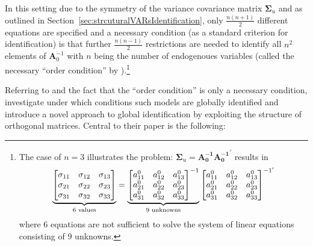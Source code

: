 \documentclass[a4paper,11pt,listof=nochaptergap,oneside,pointednumbers,bibtotoc,bigheadings,liststotoc,hidelinks]{scrbook}
\theoremstyle{mysatz}
\theoremstyle{mydefinition}
\theoremstyle{mytheorem}
\theoremstyle{mybemerkung}
\newcommand{\vect}[1]{\boldsymbol{\mathbf{#1}}}
\begin{document}
In this setting due to the symmetry of the variance covariance matrix $\vect{\Sigma}_u$ and as outlined in Section~\ref{sec:strcuturalVARsIdentification}, only $\frac{n(n+1)}{2}$ different equations are specified and a necessary condition (as a standard criterion for identification) is that further $\frac{n(n-1)}{2}$ restrictions are needed to identify all $n^2$ elements of $\vect{A}_0^{-1}$ with $n$ being the number of endogenoues variables (called the necessary ``order condition'' by \citealp{rothenberg:71}).\footnote{The case of $n=3$ illustrates the problem: $\vect{\Sigma}_u = \vect{A_{0}^{-1}} \vect{A_{0}^{-1}}^'$ results in $$		
		\underbrace{%
		\begin{bmatrix}
    		\sigma_{11} & \sigma_{12} & \sigma_{13} \\
		\sigma_{21} & \sigma_{22} & \sigma_{23} \\
		\sigma_{31} & \sigma_{32} & \sigma_{33}
 		\end{bmatrix}
}_{\text{6 values}} = \underbrace{%
		\begin{bmatrix}
    		a_{11}^0 & a_{12}^0 & a_{13}^0 \\
		a_{21}^0 & a_{22}^0 & a_{23}^0 \\
		a_{31}^0 & a_{32}^0 & a_{33}^0
 		\end{bmatrix}^{-1}
}_{\text{9 unknowns}}
\begin{bmatrix}
    		a_{11}^0 & a_{12}^0 & a_{13}^0 \\
		a_{21}^0 & a_{22}^0 & a_{23}^0 \\
		a_{31}^0 & a_{32}^0 & a_{33}^0
 		\end{bmatrix}^{{-1}'}$$ 
		where 6 equations are not sufficient to solve the system of linear equations consisting of 9 unknowns.}
		
Referring to \citet{rothenberg:71} and the fact that the ``order condition'' is only a necessary condition, \citet{rubioetal:10} investigate under which conditions such models are globally identified and introduce a novel approach to global identification by exploiting the structure of orthogonal matrices. Central to their paper is the following: 
\end{document}
